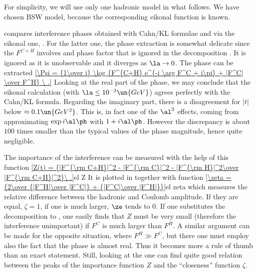 For simplicity, we will use only one hadronic model in what follows. We have chosen BSW model, because the corresponding eikonal function is known.

 compares interference phases obtained with Cahn/KL formulae and via the eikonal one, . For the latter one, the phase extraction is somewhat delicate since the $F^{C+H}$ involves and phase factor that is ignored in the decomposition . It is ignored as it is unobservable and it diverges as $\la\to 0$. The phase can be extracted
\eqref{\Psi = {1\over i} \log {F^{C+H} e^{-i \arg F^C + i\pi} + |F^C| \over F^H} \ .}{}
Looking at the real part of the phase, we may conclude that the eikonal calculation (with $\la \le 10^{-3}\un{GeV}$) agrees perfectly with the Cahn/KL formula. Regarding the imaginary part, there is a disagreement for $|t|$ below $\approx 0.1\un{GeV^2}$. This is, in fact one of the $\al^2$ effects, coming from approximating $\exp i\al\ph$ with $1+i\al\ph$. However the discrepancy is about $100$ times smaller than the typical values of the phase magnitude, hence quite negligible.


The importance of the interference can be measured with the help of this function
\eqref{Z(t) = {|F^{\rm C+H}|^2 - |F^{\rm C}|^2 - |F^{\rm H}|^2\over |F^{\rm C+H}|^2}\ .}{el Z}
It is plotted in  together with function
\eqref{\zeta = {2\over {|F^H|\over |F^C|} + {|F^C|\over |F^H|}}}{el zeta}
which measures the relative difference between the hadronic and Coulomb amplitude. If they are equal, $\zeta = 1$, if one is much larger, $\ze$ tends to $0$. If one substitutes the decomposition  to , one easily finds that $Z$ must be very small (therefore the interference unimportant) if $F^C$ is much larger than $F^H$. A similar argument can be made for the opposite situation, where $F^H \gg F^C$, but there one must employ also the fact that the phase is almost real. Thus it becomes more a rule of thumb than an exact statement. Still, looking at the  one can find quite good relation between the peaks of the importance function $Z$ and the ``closeness'' function $\zeta$.



